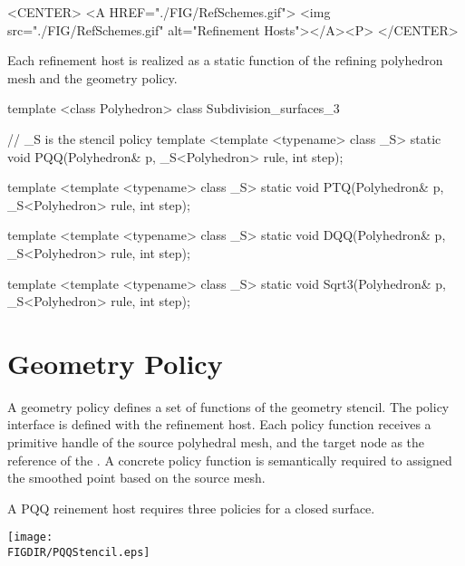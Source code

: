 \begin{ccHtmlOnly}
  <CENTER>
  <A HREF="./FIG/RefSchemes.gif">
     <img src="./FIG/RefSchemes.gif" alt="Refinement Hosts"></A><P>
  </CENTER>
\end{ccHtmlOnly}


Each refinement host is realized as a static function of
the refining polyhedron mesh and the geometry policy. 

\begin{ccExampleCode}
template <class Polyhedron>
class Subdivision_surfaces_3 {
  // _S is the stencil policy
  template <template <typename> class _S>
  static void PQQ(Polyhedron& p, _S<Polyhedron> rule, int step);

  template <template <typename> class _S>
  static void PTQ(Polyhedron& p, _S<Polyhedron> rule, int step);

  template <template <typename> class _S>
  static void DQQ(Polyhedron& p, _S<Polyhedron> rule, int step);

  template <template <typename> class _S>
  static void Sqrt3(Polyhedron& p, _S<Polyhedron> rule, int step);
}
\end{ccExampleCode}

\section{Geometry Policy}
A geometry policy defines a set of functions of the geometry stencil.
The policy interface is defined with the refinement host. Each policy 
function receives a primitive handle of the source polyhedral mesh,
and the target node as the reference of the .
A concrete policy function is semantically required to assigned 
the smoothed point based on the source mesh.

A PQQ reinement host requires three policies for a closed surface.
\begin{ccTexOnly}
  \begin{center}
    \parbox{0.5\textwidth}{%
      \texttt{[image: \\FIGDIR/PQQStencil.eps]}%
    }
  \end{center}
\end{ccTexOnly}


